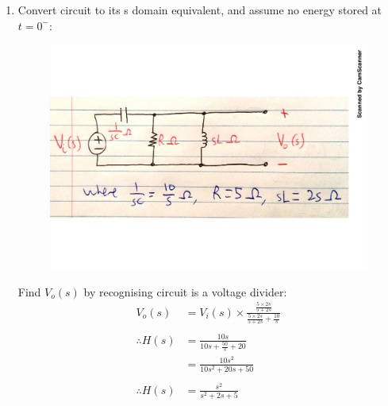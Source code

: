 \begin{enumerate}
	\item{
		Convert circuit to its s domain equivalent, and assume no energy stored at $t=0^-$:
		\begin{figure}[H]
			\centering
			\includegraphics[scale=0.55]{q3a.pdf}
		\end{figure}
		Find $V_o(s)$ by recognising circuit is a voltage divider:
		\begin{align*}
			V_o(s) &= V_i(s) \times \frac{\frac{5\times2s}{5+2s}}{\frac{5\times2s}{5+2s} + \frac{10}{s}} \\ 
			\\
			\therefore H(s) &= \frac{10s}{10s+ \frac{50}{s} + 20} \\
			&= \frac{10s^2}{10s^2+20s+50} \\
			\\
			\therefore H(s) &= \frac{s^2}{s^2+2s+5}
		\end{align*}
		\\
	}


\end{enumerate}
